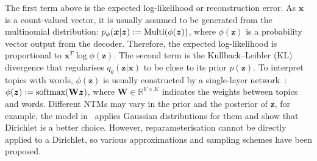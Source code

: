 \documentclass{article}
\renewcommand{\vec}{\boldsymbol}
\newcommand{\matr}[1]{\mathbf{#1}}
\newcommand{\eqdef}{\vcentcolon=}
\begin{document}
The first term above is the expected log-likelihood or reconstruction error. As $\vec{x}$ is a count-valued vector, it is usually assumed to be generated from the multinomial distribution: $p_\phi(\vec{x}|\vec{z})\eqdef\text{Multi}(\phi(\vec{z}))$, where $\phi(\vec{z})$ is a probability vector output from the decoder. Therefore, the expected log-likelihood is proportional to $\vec{x}^T \log \phi(\vec{z})$. The second term is the Kullback–Leibler (KL) divergence that regularises $q_{\theta}(\vec{z} | \vec{x})$ to be close to its prior $p(\vec{z})$. To interpret topics with words, $\phi(\vec{z})$ is usually constructed by a single-layer network~\citep{srivastava2017autoencoding}: $\phi(\vec{z}) \eqdef \text{softmax}(\matr{W} \vec{z})$, where $\matr{W} \in \mathbb{R}^{V \times K}$ indicates the weights between topics and words.
Different NTMs may vary in the prior and the posterior of $\vec{z}$, for example, the model in~\citet{miao2017discovering} applies Gaussian distributions for them and \citet{srivastava2017autoencoding,burkhardt2019decoupling} show that Dirichlet is a better choice. However, reparameterisation cannot be directly applied to a Dirichlet, so various approximations and sampling schemes have been proposed.
\end{document}
